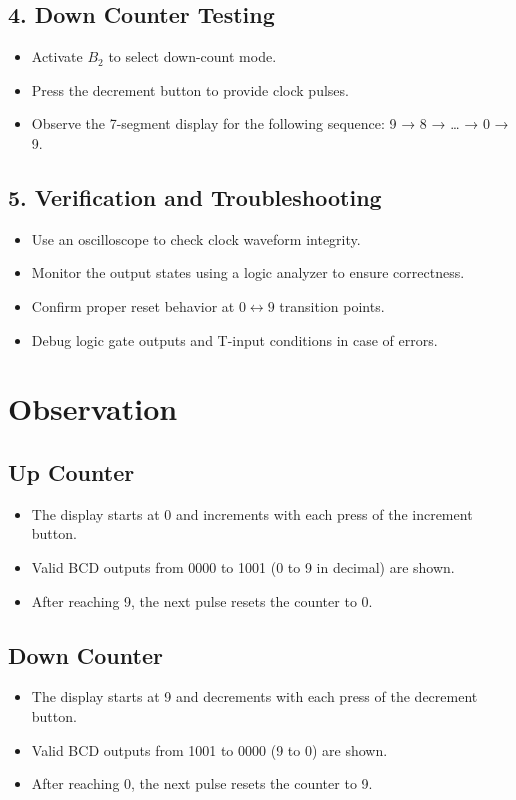 \documentclass[12pt]{article}
\begin{document}
\subsection*{4. Down Counter Testing}
\begin{itemize}
    \item Activate $B_2$ to select down-count mode.
    \item Press the decrement button to provide clock pulses.
    \item Observe the 7-segment display for the following sequence: 9 → 8 → … → 0 → 9.
\end{itemize}

\subsection*{5. Verification and Troubleshooting}
\begin{itemize}
    \item Use an oscilloscope to check clock waveform integrity.
    \item Monitor the output states using a logic analyzer to ensure correctness.
    \item Confirm proper reset behavior at $0 \leftrightarrow 9$ transition points.
    \item Debug logic gate outputs and T-input conditions in case of errors.
\end{itemize}

\section*{Observation}

\subsection*{Up Counter}
\begin{itemize}
    \item The display starts at 0 and increments with each press of the increment button.
    \item Valid BCD outputs from 0000 to 1001 (0 to 9 in decimal) are shown.
    \item After reaching 9, the next pulse resets the counter to 0.
\end{itemize}

\subsection*{Down Counter}
\begin{itemize}
    \item The display starts at 9 and decrements with each press of the decrement button.
    \item Valid BCD outputs from 1001 to 0000 (9 to 0) are shown.
    \item After reaching 0, the next pulse resets the counter to 9.
\end{itemize}
\end{document}
